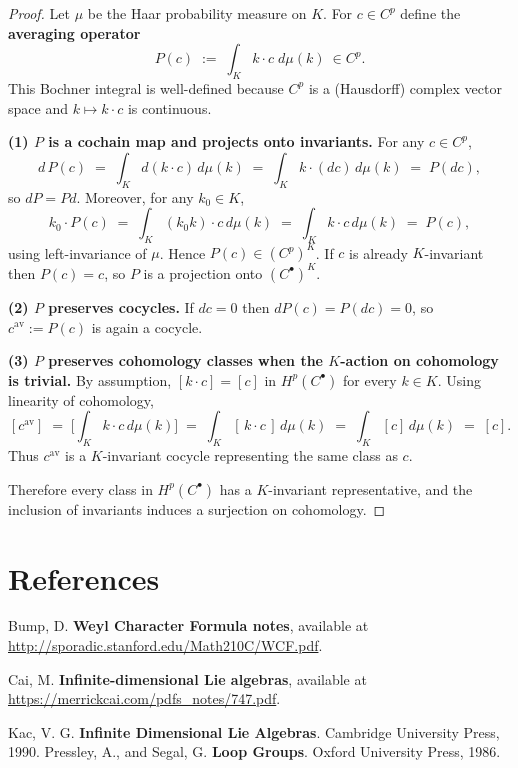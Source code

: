 \documentclass[12pt]{article}
\begin{document}
\begin{proof}
    Let $\mu$ be the Haar probability measure on $K$. For $c\in C^p$ define the
    \textbf{averaging operator}
    \[
        P(c)\;:=\;\int_{K} k\cdot c\; d\mu(k)\ \in C^p.
    \]
    This Bochner integral is well-defined because $C^p$ is a (Hausdorff) complex
    vector space and $k\mapsto k\cdot c$ is continuous.

    \smallskip

    \textbf{(1) $P$ is a cochain map and projects onto invariants.}
    For any $c\in C^p$,
    \[
        d\,P(c)\;=\;\int_K d(k\cdot c)\,d\mu(k)\;=\;\int_K k\cdot (dc)\,d\mu(k)\;=\;P(dc),
    \]
    so $dP=Pd$. Moreover, for any $k_0\in K$,
    \[
        k_0\cdot P(c)\;=\;\int_K (k_0k)\cdot c\,d\mu(k)\;=\;\int_K k\cdot c\,d\mu(k)\;=\;P(c),
    \]
    using left-invariance of $\mu$. Hence $P(c)\in (C^p)^K$. If $c$ is already
    $K$-invariant then $P(c)=c$, so $P$ is a projection onto $(C^\bullet)^K$.

    \smallskip

    \textbf{(2) $P$ preserves cocycles.}
    If $dc=0$ then $dP(c)=P(dc)=0$, so $c^{\mathrm{av}}:=P(c)$ is again a cocycle.

    \smallskip

    \textbf{(3) $P$ preserves cohomology classes when the $K$-action on cohomology is trivial.}
    By assumption, $[k\cdot c]=[c]$ in $H^p(C^\bullet)$ for every $k\in K$. Using linearity
    of cohomology,
    \[
        [c^{\mathrm{av}}]\;=\;\Big[\int_K k\cdot c\,d\mu(k)\Big]
        \;=\;\int_K [\,k\cdot c\,]\,d\mu(k)
        \;=\;\int_K [c]\,d\mu(k)
        \;=\;[c].
    \]
    Thus $c^{\mathrm{av}}$ is a $K$-invariant cocycle representing the same class as $c$.

    Therefore every class in $H^p(C^\bullet)$ has a $K$-invariant representative,
    and the inclusion of invariants induces a surjection on cohomology.
\end{proof}


\section{References}
\begin{enumerate}
     Bump, D. \textbf{Weyl Character Formula notes}, available at \url{http://sporadic.stanford.edu/Math210C/WCF.pdf}.

     Cai, M. \textbf{Infinite-dimensional Lie algebras}, available at \url{https://merrickcai.com/pdfs_notes/747.pdf}.

     Kac, V. G. \textbf{Infinite Dimensional Lie Algebras}. Cambridge University Press, 1990.
     Pressley, A., and Segal, G. \textbf{Loop Groups}. Oxford University Press, 1986.
\end{enumerate}
\end{document}
